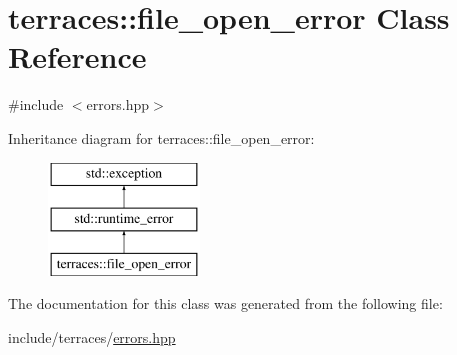 \hypertarget{classterraces_1_1file__open__error}{}\section{terraces\+:\+:file\+\_\+open\+\_\+error Class Reference}
\label{classterraces_1_1file__open__error}


{\ttfamily \#include $<$errors.\+hpp$>$}

Inheritance diagram for terraces\+:\+:file\+\_\+open\+\_\+error\+:\begin{figure}[H]
\begin{center}
\leavevmode
\includegraphics[height=3.000000cm]{classterraces_1_1file__open__error}
\end{center}
\end{figure}


The documentation for this class was generated from the following file\+:\begin{DoxyCompactItemize}
\item 
include/terraces/\hyperlink{errors_8hpp}{errors.\+hpp}\end{DoxyCompactItemize}
